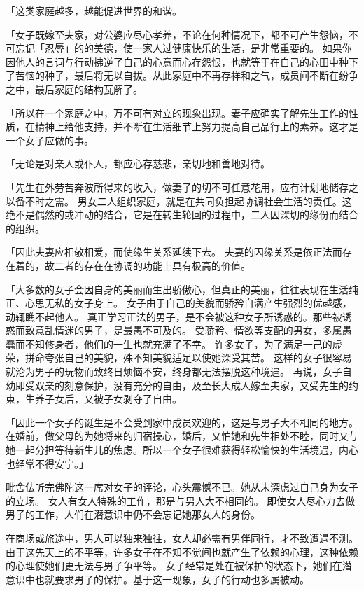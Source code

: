 \documentclass[twoside,openany]{book}
\begin{document}
「这类家庭越多，越能促进世界的和谐。

「女子既嫁至夫家，对公婆应尽心孝养，不论在何种情况下，都不可产生怨恼，不可忘记「忍辱」的的美德，使一家人过健康快乐的生活，是非常重要的。
如果你因他人的言词与行动拂逆了自己的心意而心存怨恨，也就等于在自己的心田中种下了苦恼的种子，最后将无以自拔。从此家庭中不再存祥和之气，成员间不断在纷争之中，最后家庭的结构瓦解了。

「所以在一个家庭之中，万不可有对立的现象出现。妻子应确实了解先生工作的性质，在精神上给他支持，并不断在生活细节上努力提高自己品行上的素养。这才是一个女子应做的事。

「无论是对亲人或仆人，都应心存慈悲，亲切地和善地对待。

「先生在外劳苦奔波所得来的收入，做妻子的切不可任意花用，应有计划地储存之以备不时之需。
男女二人组织家庭，就是在共同负担起协调社会生活的责任。这绝不是偶然的或冲动的结合，它是在转生轮回的过程中，二人因深切的缘份而结合的组织。

「因此夫妻应相敬相爱，而使缘生关系延续下去。
夫妻的因缘关系是依正法而存在着的，故二者的存在在协调的功能上具有极高的价值。

「大多数的女子会因自身的美丽而生出骄傲心，但真正的美丽，往往表现在生活纯正、心思无私的女子身上。
女子由于自己的美貌而骄矜自满产生强烈的优越感，动辄瞧不起他人。
真正学习正法的男子，是不会被这种女子所诱惑的。那些被诱惑而致意乱情迷的男子，是最愚不可及的。
受骄矜、情欲等支配的男女，多属愚蠢而不知修身者，他们的一生也就充满了不幸。
许多女子，为了满足一己的虚荣，拼命夸张自己的美貌，殊不知美貌适足以使她深受其苦。
这样的女子很容易就沦为男子的玩物而致终日烦恼不安，终身都无法摆脱这种境遇。
再说，女子自幼即受双亲的刻意保护，没有充分的自由，及至长大成人嫁至夫家，又受先生的约束，生养子女后，又被子女剥夺了自由。

「因此一个女子的诞生是不会受到家中成员欢迎的，这是与男子大不相同的地方。在婚前，做父母的为她将来的归宿操心，婚后，又怕她和先生相处不睦，同时又与她一起分担等待新生儿的焦虑。所以一个女子很难获得轻松愉快的生活境遇，内心也经常不得安宁。」

毗舍佉听完佛陀这一席对女子的评论，心头震憾不已。她从未深虑过自己身为女子的立场。
女人有女人特殊的工作，那是与男人大不相同的。
即使女人尽心力去做男子的工作，人们在潜意识中仍不会忘记她那女人的身份。

在商场或旅途中，男人可以独来独往，女人却必需有男伴同行，才不致遭遇不测。
由于这先天上的不平等，许多女子在不知不觉间也就产生了依赖的心理，这种依赖的心理使她们更无法与男子争平等。
女子经常是处在被保护的状态下，她们在潜意识中也就要求男子的保护。基于这一现象，女子的行动也多属被动。
\end{document}
